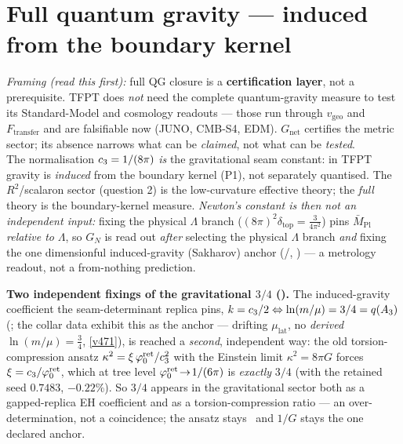 \section{Full quantum gravity --- induced from the boundary kernel}
\emph{Framing (read this first):} full QG closure is a \textbf{certification layer}, not a prerequisite.
TFPT does \emph{not} need the complete quantum-gravity measure to test its Standard-Model and cosmology
readouts --- those run through $v_{\mathrm{geo}}$ and $F_{\mathrm{transfer}}$ and are falsifiable now
(JUNO, CMB-S4, EDM). $G_{\mathrm{net}}$ certifies the metric sector; its absence narrows what can be
\emph{claimed}, not what can be \emph{tested}.
\smallskip\\
The normalisation $c_3=1/(8\pi)$ \emph{is} the gravitational seam constant: in TFPT gravity is
\emph{induced} from the boundary kernel (P1), not separately quantised. The $R^2$/scalaron sector
(question 2) is the low-curvature effective theory; the \emph{full} theory is the boundary-kernel measure.
\emph{Newton's constant is then not an \emph{independent} input:} fixing the physical $\Lambda$ branch
($(8\pi)^2\delta_{\mathrm{top}}=\tfrac{3}{4\pi^2}$) pins $\bar M_{\mathrm{Pl}}$ \emph{relative to} $\Lambda$, so
$G_N$ is read out \emph{after} selecting the physical $\Lambda$ branch \emph{and} fixing the one dimensionful
induced-gravity (Sakharov) anchor (\mE/\mC, ) --- a metrology readout,
not a from-nothing prediction.

\par\smallskip\noindent\textbf{Two independent fixings of the gravitational $3/4$
().} The induced-gravity coefficient the seam-determinant replica pins,
$k=c_3/2\Leftrightarrow\ln(m/\mu)=3/4=q(A_3)$ (; the collar data
exhibit this as the anchor --- drifting $\mu_{\mathrm{lat}}$, no \emph{derived} $\ln(m/\mu){=}\tfrac34$,
\vref{v471}), is reached a \emph{second}, independent way: the old torsion-compression ansatz $\kappa^2=\xi\,\varphi_0^{\mathrm{ret}}/c_3^2$ with the
Einstein limit $\kappa^2=8\pi G$ forces $\xi=c_3/\varphi_0^{\mathrm{ret}}$, which at tree level $\varphi_0^{\mathrm{ret}}\!\to\!1/(6\pi)$ is
\emph{exactly} $3/4$ (with the retained seed $0.7483$, $-0.22\%$). So $3/4$ appears in the gravitational
sector both as a gapped-replica EH coefficient and as a torsion-compression ratio --- an over-determination,
not a coincidence; the ansatz stays \mC\ and $1/G$ stays the one declared anchor.

